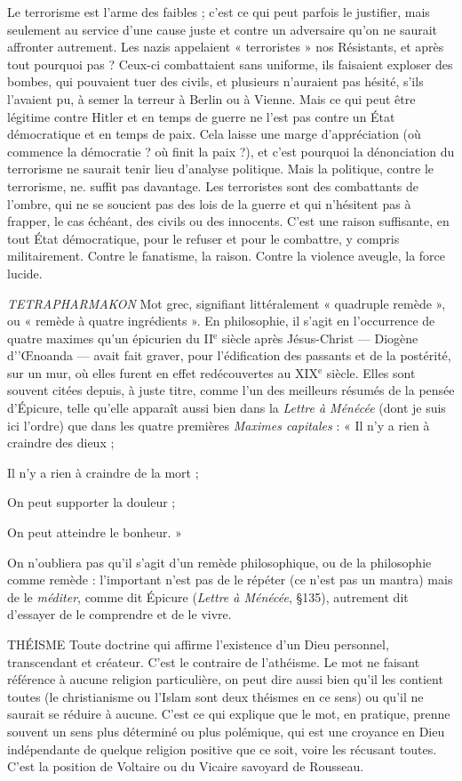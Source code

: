 Le terrorisme est l’arme des faibles ; c’est ce qui peut parfois le justifier, mais
seulement au service d’une cause juste et contre un adversaire qu'on ne saurait
affronter autrement. Les nazis appelaient « terroristes » nos Résistants, et après
tout pourquoi pas ? Ceux-ci combattaient sans uniforme, ils faisaient exploser des
bombes, qui pouvaient tuer des civils, et plusieurs n'auraient pas hésité, s’ils
l'avaient pu, à semer la terreur à Berlin ou à Vienne. Mais ce qui peut être légitime
contre Hitler et en temps de guerre ne l’est pas contre un État démocratique
et en temps de paix. Cela laisse une marge d’appréciation (où commence la
démocratie ? où finit la paix ?), et c’est pourquoi la dénonciation du terrorisme ne
saurait tenir lieu d’analyse politique. Mais la politique, contre le terrorisme, ne.
suffit pas davantage. Les terroristes sont des combattants de l'ombre, qui ne se
soucient pas des lois de la guerre et qui n’hésitent pas à frapper, le cas échéant, des
civils ou des innocents. C’est une raison suffisante, en tout État démocratique,
pour le refuser et pour le combattre, y compris militairement. Contre le fanatisme,
la raison. Contre la violence aveugle, la force lucide.

{\it TETRAPHARMAKON} Mot grec, signifiant littéralement « quadruple remède »,
ou « remède à quatre ingrédients ». En philosophie,
il s’agit en l'occurrence de quatre maximes qu’un épicurien du {\footnotesize II$^\text{e}$} siècle après
Jésus-Christ — Diogène d’'Œnoanda — avait fait graver, pour l'édification des passants
et de la postérité, sur un mur, où elles furent en effet redécouvertes au {\footnotesize XIX$^\text{e}$}
siècle. Elles sont souvent citées depuis, à juste titre, comme l’un des meilleurs
résumés de la pensée d’Épicure, telle qu’elle apparaît aussi bien dans la {\it Lettre à
Ménécée} (dont je suis ici l’ordre) que dans les quatre premières {\it Maximes capitales} :
« Il n’y a rien à craindre des dieux ;

Il n’y a rien à craindre de la mort ;

On peut supporter la douleur ;

On peut atteindre le bonheur. »

On n’oubliera pas qu’il s’agit d’un remède philosophique, ou de la philosophie
comme remède : l'important n’est pas de le répéter (ce n’est pas un
mantra) mais de le {\it méditer}, comme dit Épicure ({\it Lettre à Ménécée}, \S 135),
autrement dit d’essayer de le comprendre et de le vivre.

THÉISME Toute doctrine qui affirme l'existence d’un Dieu personnel,
transcendant et créateur. C’est le contraire de l’athéisme. Le mot
ne faisant référence à aucune religion particulière, on peut dire aussi bien qu’il les
contient toutes (le christianisme ou l’Islam sont deux théismes en ce sens) ou
qu'il ne saurait se réduire à aucune. C’est ce qui explique que le mot, en pratique,
prenne souvent un sens plus déterminé ou plus polémique, qui est une croyance
en Dieu indépendante de quelque religion positive que ce soit, voire les récusant
toutes. C’est la position de Voltaire ou du Vicaire savoyard de Rousseau.

